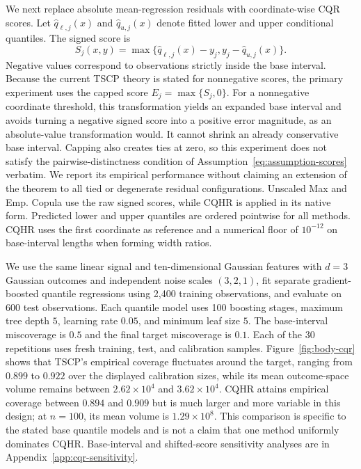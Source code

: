 We next replace absolute mean-regression residuals with coordinate-wise CQR
scores. Let $\widehat q_{\ell,j}(x)$ and $\widehat q_{u,j}(x)$ denote fitted
lower and upper conditional quantiles. The signed score is
\[
  S_j(x,y)
  = \max\{\widehat q_{\ell,j}(x)-y_j,
           y_j-\widehat q_{u,j}(x)\}.
\]
Negative values correspond to observations strictly inside the base interval.
Because the current TSCP theory is stated for nonnegative scores, the primary
experiment uses the capped score $E_j=\max\{S_j,0\}$. For a nonnegative coordinate threshold, this transformation yields an
expanded base interval and avoids turning a negative signed score into a
positive error magnitude, as an absolute-value transformation would. It
cannot shrink an already conservative base interval. Capping also creates
ties at zero, so this experiment does not satisfy the pairwise-distinctness
condition of Assumption~\ref{eq:assumption-scores} verbatim. We report its
empirical performance without claiming an extension of the theorem to
all tied or degenerate residual configurations. Unscaled Max and Emp. Copula use the raw signed
scores, while CQHR is applied in its native form. Predicted lower and upper
quantiles are ordered pointwise for all methods. CQHR uses the first
coordinate as reference and a numerical floor of $10^{-12}$ on base-interval
lengths when forming width ratios.

We use the same linear signal and ten-dimensional Gaussian features with
$d=3$ Gaussian outcomes and independent noise scales $(3,2,1)$, fit separate
gradient-boosted quantile regressions using 2,400 training observations, and
evaluate on 600 test observations. Each quantile model uses 100 boosting
stages, maximum tree depth $5$, learning rate $0.05$, and minimum leaf size
$5$. The base-interval miscoverage is $0.5$ and
the final target miscoverage is $0.1$. Each of the 30 repetitions uses fresh
training, test, and calibration samples. Figure~\ref{fig:body-cqr} shows that
TSCP's empirical coverage fluctuates around the target, ranging from $0.899$
to $0.922$ over the displayed calibration sizes, while its mean outcome-space
volume remains between $2.62\times10^4$ and $3.62\times10^4$. CQHR attains
empirical coverage between $0.894$ and $0.909$ but is much larger and more
variable in this design; at $n=100$, its mean volume is
$1.29\times10^8$. This comparison is specific to the stated base
quantile models and is not a claim that one method uniformly dominates CQHR.
Base-interval and shifted-score sensitivity analyses are in
Appendix~\ref{app:cqr-sensitivity}.

